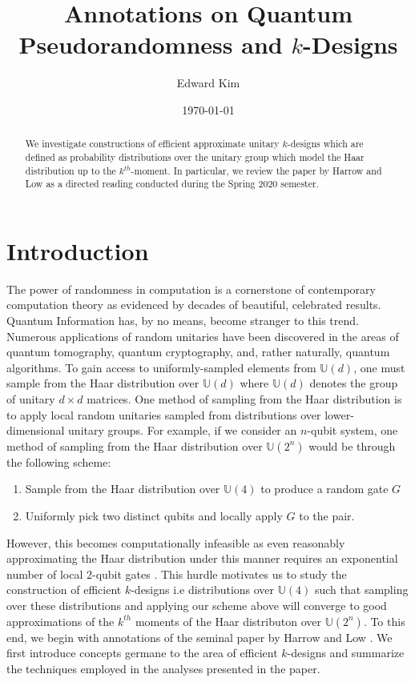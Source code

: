 \documentclass[12pt]{amsart}
\theoremstyle{definition}
\theoremstyle{remark}
\numberwithin{equation}{section}
\theoremstyle{remark}
\begin{document}
\title{Annotations on Quantum Pseudorandomness and $k$-Designs}
\author{Edward Kim}
\date{\today}
\maketitle

\begin{abstract}
  We investigate constructions of efficient approximate unitary $k$-designs which are defined as probability distributions over the unitary group which model the Haar distribution up to the $k^{th}$-moment. In particular, we review the paper by Harrow and Low as a directed reading conducted during the Spring 2020 semester.
\end{abstract}

\tableofcontents

\section{Introduction}

The power of randomness in computation is a cornerstone of contemporary computation theory as evidenced by decades of beautiful, celebrated results. Quantum Information has, by no means, become stranger to this trend. Numerous applications of random unitaries have been discovered in the areas of quantum tomography, quantum cryptography, and, rather naturally, quantum algorithms. To gain access to uniformly-sampled elements from $\mathbb{U}(d)$, one must sample from the Haar distribution over $\mathbb{U}(d)$ where $\mathbb{U}(d)$ denotes the group of unitary $d \times d$ matrices. One method of sampling from the Haar distribution is to apply local random unitaries sampled from distributions over lower-dimensional unitary groups. For example, if we consider an $n$-qubit system, one method of sampling from the Haar distribution over $\mathbb{U}(2^n)$ would be through the following scheme:
\begin{enumerate}
  \item Sample from the Haar distribution over $\mathbb{U}(4)$ to produce a random gate $G$
  \item Uniformly pick two distinct qubits and locally apply $G$ to the pair.
\end{enumerate}
However, this becomes computationally infeasible as even reasonably approximating the Haar distribution under this manner requires an exponential number of local 2-qubit gates \cite{knill}. This hurdle motivates us to study the construction of efficient $k$-designs i.e distributions over $\mathbb{U}(4)$ such that sampling over these distributions and applying our scheme above will converge to good approximations of the $k^{th}$ moments of the Haar distributon over $\mathbb{U}(2^n)$. To this end, we begin with annotations of the seminal paper by Harrow and Low \cite{harrlow}. We first introduce concepts germane to the area of efficient $k$-designs and summarize the techniques employed in the analyses presented in the paper.
\end{document}
